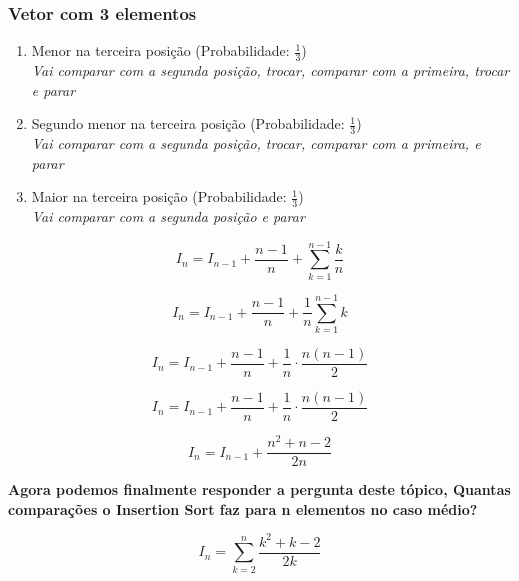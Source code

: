 \documentclass{article}
\begin{document}

\subsubsection{Vetor com 3 elementos}
\begin{enumerate}
\item {Menor na terceira posição (Probabilidade: $\frac{1}{3}$)\\}
    \em{Vai comparar com a segunda posição, trocar, comparar com a primeira, trocar e parar\\}
\item {Segundo menor na terceira posição (Probabilidade: $\frac{1}{3}$)\\}
    \em{Vai comparar com a segunda posição, trocar, comparar com a primeira, e parar\\}
\item {Maior na terceira posição (Probabilidade: $\frac{1}{3}$)\\}
    \em{Vai comparar com a segunda posição e parar\\}
\end{enumerate}




\begin{equation}
I_n = I_{n-1} + \frac{n-1}{n} + \sum_{k = 1}^{n-1} \frac{k}{n} 
\end{equation}

\begin{equation}
    I_n = I_{n-1} + \frac{n-1}{n} + \frac{1}{n}\sum_{k = 1}^{n-1} k
\end{equation}

\begin{equation}
    I_n = I_{n-1} + \frac{n-1}{n} + \frac{1}{n} \cdot \frac{n(n-1)}{2}
\end{equation}

\begin{equation}
    I_n = I_{n-1} + \frac{n-1}{n} + \frac{1}{n} \cdot \frac{n(n-1)}{2}
\end{equation}

\begin{equation}
    I_n = I_{n-1} + \frac{n^2 + n - 2}{2n} 
\end{equation}

\textbf{Agora podemos finalmente responder a pergunta deste tópico, Quantas comparações o Insertion Sort faz para n elementos no caso médio?}

\begin{equation}
    I_n = \sum_{k = 2}^{n} \frac{k^2 + k - 2}{2k} 
\end{equation}

\end{document}
